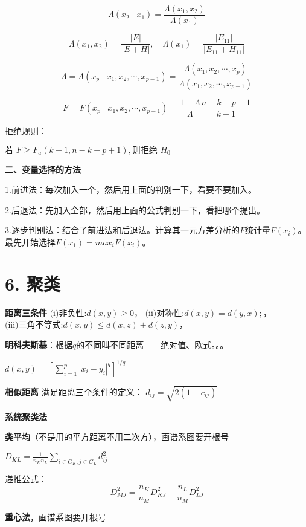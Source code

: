\documentclass[10pt,a4paper]{ctexart} %
\begin{document}
\begin{multicols*}{3}
		$$\Lambda\left(x_{2}\mid x_{1}\right)=\frac{\Lambda\left(x_{1},x_{2}\right)}{\Lambda\left(x_{1}\right)}$$
		
		$$\Lambda\left(x_{1},x_{2}\right)=\frac{\left|E\right|}{\left|E+H\right|},\quad\Lambda\left(x_{1}\right)=\frac{\left|E_{11}\right|}{\left|E_{11}+H_{11}\right|}$$
		
		$$\Lambda=\Lambda\left(x_{p}\mid x_{1},x_{2},\cdots,x_{p-1}\right)=\frac{\Lambda\left(x_{1},x_{2},\cdots,x_{p}\right)}{\Lambda\left(x_{1},x_{2},\cdots,x_{p-1}\right)}$$
		
		$$F=F\left(x_{p}\mid x_{1},x_{2},\cdots,x_{p-1}\right)=\frac{1-\Lambda }{\Lambda}\frac{n-k-p+1}{k-1}$$
		
		拒绝规则：
		
		$\text{若 }F\geqslant F_a\left(k-1,n-k-p+1\right),\text{则拒绝 }H_0$
		
		\textbf{二、变量选择的方法}
		
		1.前进法：每次加入一个，然后用上面的判别一下，看要不要加入。
		
		2.后退法：先加入全部，然后用上面的公式判别一下，看把哪个提出。
		
		3.逐步判别法：结合了前进法和后退法。计算其一元方差分析的$F$统计量$F(x_i)$。最先开始选择$F(x_1)=max_iF(x_i)$。
		
		\section*{\centering \normalsize 6. 聚类}
		\textbf{距离三条件}
		$\text{(i)非负性:}d(x,y)\geqslant0$，
		$\text{(ii)对称性:}d(x,y)=d(y,x);$，
		$\text{(iii)三角不等式:}d(x,y)\leqslant d(x,z)+d(z,y)$，
		
		\textbf{明科夫斯基}：根据$q$的不同叫不同距离——绝对值、欧式。。。
		
		$d\left(x,y\right)=\left[\sum_{i=1}^{p}\left|x_{i}-y_{i}\right|^{q}\right]^{1/q}$
		
		\textbf{相似距离}
		满足距离三个条件的定义：
		$d_{ij}=\sqrt{2(1-c_{ij})}$
		
		\textbf{系统聚类法}
		
		\textbf{类平均}（不是用的平方距离不用二次方），画谱系图要开根号
		
		$D_{KL}=\frac{1}{n_Kn_L}\sum_{i \in G_K, j \in G_L}d_{ij}^2$
		
		递推公式：
		$$D_{MJ}^{2}=\frac{n_{K}}{n_{M}}D_{KJ}^{2}+\frac{n_{L}}{n_{M}}D_{LJ}^{2}$$
		
		\textbf{重心法}，画谱系图要开根号
		

\end{multicols*}
\end{document}
